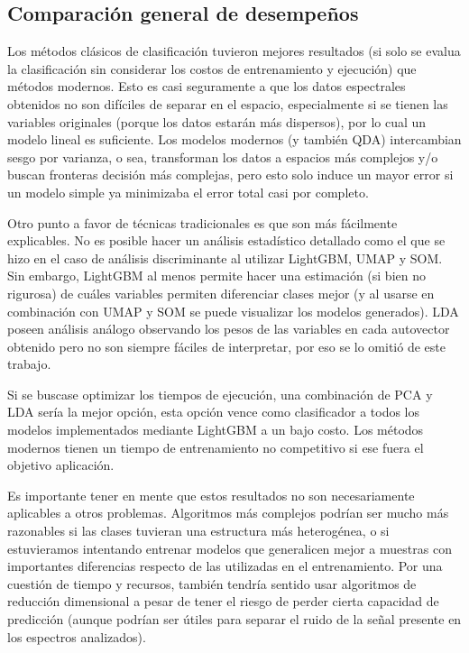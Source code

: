 \documentclass[12pt]{article}
\begin{document}
\subsection{Comparación general de desempeños}
Los métodos clásicos de clasificación tuvieron mejores resultados (si solo se evalua la clasificación sin considerar los costos de entrenamiento y ejecución) que métodos modernos. Esto es casi seguramente a que los datos espectrales obtenidos no son difíciles de separar en el espacio, especialmente si se tienen las variables originales (porque los datos estarán más dispersos), por lo cual un modelo lineal es suficiente. Los modelos modernos (y también QDA) intercambian sesgo por varianza, o sea, transforman los datos a espacios más complejos y/o buscan fronteras decisión más complejas, pero esto solo induce un mayor error si un modelo simple ya minimizaba el error total casi por completo. 

Otro punto a favor de técnicas tradicionales es que son más fácilmente explicables. No es posible hacer un análisis estadístico detallado como el que se hizo en el caso de análisis discriminante al utilizar LightGBM, UMAP y SOM. Sin embargo, LightGBM al menos permite hacer una estimación (si bien no rigurosa) de cuáles variables permiten diferenciar clases mejor (y al usarse en combinación con UMAP y SOM se puede visualizar los modelos generados). LDA poseen análisis análogo observando los pesos de las variables en cada autovector obtenido pero no son siempre fáciles de interpretar, por eso se lo omitió de este trabajo.

Si se buscase optimizar los tiempos de ejecución, una combinación de PCA y LDA sería la mejor opción, esta opción vence como clasificador a todos los modelos implementados mediante LightGBM a un bajo costo. Los métodos modernos tienen un tiempo de entrenamiento no competitivo si ese fuera el objetivo aplicación.

Es importante tener en mente que estos resultados no son necesariamente aplicables a otros problemas. Algoritmos más complejos podrían ser mucho más razonables si las clases tuvieran una estructura más heterogénea, o si estuvieramos intentando entrenar modelos que generalicen mejor a muestras con importantes diferencias respecto de las utilizadas en el entrenamiento. Por una cuestión de tiempo y recursos, también tendría sentido usar algoritmos de reducción dimensional a pesar de tener el riesgo de perder cierta capacidad de predicción (aunque podrían ser útiles para separar el ruido de la señal presente en los espectros analizados).
\end{document}
